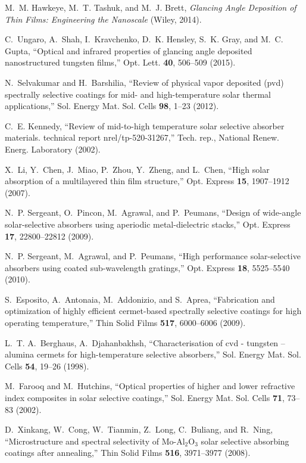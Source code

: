 \documentclass[10pt,letterpaper]{article}
\begin{document}
\begin{thebibliography}{100}
M.~M. Hawkeye, M.~T. Tashuk, and M.~J. Brett, \emph{Glancing Angle Deposition
  of Thin Films: Engineering the Nanoscale} (Wiley, 2014).

C.~Ungaro, A.~Shah, I.~Kravchenko, D.~K. Hensley, S.~K. Gray, and M.~C. Gupta,
  \enquote{Optical and infrared properties of glancing angle deposited
  nanostructured tungsten films,} Opt. Lett. \textbf{40}, 506--509 (2015).

N.~Selvakumar and H.~Barshilia, \enquote{Review of physical vapor deposited
  (pvd) spectrally selective coatings for mid- and high-temperature solar
  thermal applications,} Sol. Energy Mat. Sol. Cells \textbf{98}, 1--23 (2012).

C.~E. Kennedy, \enquote{Review of mid-to-high temperature solar selective
  absorber materials. technical report nrel/tp-520-31267,} Tech. rep., National
  Renew. Energ. Laboratory (2002).

X.~Li, Y.~Chen, J.~Miao, P.~Zhou, Y.~Zheng, and L.~Chen, \enquote{High solar
  absorption of a multilayered thin film structure,} Opt. Express \textbf{15},
  1907--1912 (2007).

N.~P. Sergeant, O.~Pincon, M.~Agrawal, and P.~Peumans, \enquote{Design of
  wide-angle solar-selective absorbers using aperiodic metal-dielectric
  stacks,} Opt. Express \textbf{17}, 22800--22812 (2009).

N.~P. Sergeant, M.~Agrawal, and P.~Peumans, \enquote{High performance
  solar-selective absorbers using coated sub-wavelength gratings,} Opt. Express
  \textbf{18}, 5525--5540 (2010).

S.~Esposito, A.~Antonaia, M.~Addonizio, and S.~Aprea, \enquote{Fabrication and
  optimization of highly efficient cermet-based spectrally selective coatings
  for high operating temperature,} Thin Solid Films \textbf{517}, 6000--6006
  (2009).

L.~T. A.~Berghaus, A.~Djahanbakhsh, \enquote{Characterisation of cvd - tungsten
  – alumina cermets for high-temperature selective absorbers,} Sol. Energy
  Mat. Sol. Cells \textbf{54}, 19--26 (1998).

M.~Farooq and M.~Hutchins, \enquote{Optical properties of higher and lower
  refractive index composites in solar selective coatings,} Sol. Energy Mat.
  Sol. Cells \textbf{71}, 73--83 (2002).

D.~Xinkang, W.~Cong, W.~Tianmin, Z.~Long, C.~Buliang, and R.~Ning,
  \enquote{Microstructure and spectral selectivity of {M}o-{A}l$_2${O}$_3$
  solar selective absorbing coatings after annealing,} Thin Solid Films
  \textbf{516}, 3971--3977 (2008).


\end{thebibliography}
\end{document}
